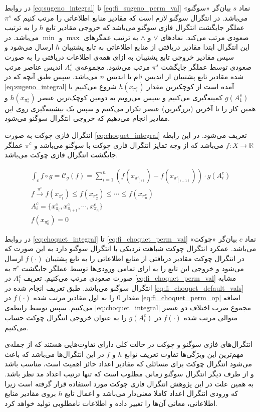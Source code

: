 در روابط
\ref{eq:sugeno_integral} تا \ref{eq:fi_sugeno_perm_val}
نماد $s$ بیان‌گر «سوگنو» می‌‌باشد. در انتگرال‌ سوگنو لازم است که مقادیر منابع اطلاعاتی را مرتب کنیم که $\pi^s$ عملگر جایگشت انتگرال فازی سوگنو می‌باشد که خروجی مقادیر تابع $h$ را به ترتیب صعودی مرتب می‌کند. نمادهای $\vee$ و $\wedge$ به ترتیب عمگرهای $\max$ و $\min$ می‌باشد. در این انتگرال ابتدا مقادیر دریافتی از منابع اطلاعاتی به تابع پشتیبان $h$ ارسال می‌شود و سپس مقادیر خروجی تابع پشتیبان به ازای همه‌ی اطلاعات دریافتی را به صورت صعودی توسط عملگر جایگشت $\pi^s$ مرتب می‌شود. مجموعه‌ی $A_i^s$ اندیس عناصر مرتب شده مقادیر تابع پشتیبان از اندیس $i$ام تا اندیس $n$ می‌باشد. سپس طبق آنچه که در \ref{eq:sugeno_integral} آمده است از کوچکترین مقدار $h(x_{\pi_1^s})$ شروع می‌کنیم با $g(A_1^s)$ کمینه‌گیری می‌کنیم و سپس می‌رویم به دومین کوچک‌ترین عنصر $h(x_{\pi_2^s})$ و همین کار را تا آخرین (بزرگترین) عنصر تکرار می‌کنیم و سپس یک بیشینه‌گیری روی این مقادیر انجام می‌دهیم که خروجی انتگرال سوگنو می‌شود.

انتگرال فازی چوکت به صورت \ref{eq:choquet_integral} تعریف می‌شود. در این رابطه
$f : X \rightarrow \mathbb{R}$
می‌باشد که از وجه تمایز انتگرال فازی چوکت با سوگنو می‌‌باشد و $\pi^c$ عملگر جایگشت انتگرال فازی چوکت می‌باشد.

\begin{eqnarray}
\int_{c} f \circ g = \mathcal{C}_g(f) = \sum_{i = 1}^{n} \left( f(x_{\pi_{(i)}^c}) - f(x_{\pi_{(i-1)}^c}) \right) \cdot g(A_i^c)\label{eq:choquet_integral}\\
f \xrightarrow{\pi^c} f(x_{\pi_1^c}) \leq f(x_{\pi_2^c}) \leq \cdots \leq f(x_{\pi_n^c})\label{eq:fi_choquet_perm_op}\\
A_i^c = \{x_{\pi_i}^c, x_{\pi_{i+1}}^c, \cdots, x_{\pi_n}^c\}\label{eq:fi_choquet_perm_val}\\
f(x_{\pi^c_0}) = 0\label{eq:fi_choquet_default_vals}
\end{eqnarray}

در روابط
\ref{eq:choquet_integral} تا \ref{eq:fi_choquet_perm_val}
نماد $c$ بیان‌گر «چوکت» می‌‌باشد. عمکرد انتگرال چوکت شباهت نزدیکی با انتگرال سوگنو دارد به این صورت که در انتگرال چوکت مقادیر دریافتی از منابع اطلاعاتی را به تابع پشتیبان $f(\cdot)$ ارسال می‌شود و خروجی این تابع را به ازای تمامی ورودی‌ها توسط عملگر جایگشت $\pi^c$ به صورت صعودی مرتب می‌کنیم. تعریف $A_i^c$ در \ref{eq:fi_choquet_perm_val} مشابه انتگرال سوگنو می‌باشد. طبق تعریف انجام شده در \ref{eq:fi_choquet_default_vals} مقدار 0 را به اول مقادیر مرتب شده $f(\cdot)$ در \ref{eq:fi_choquet_perm_op} اضافه می‌کنیم. سپس توسط رابطه‌ی \ref{eq:choquet_integral} مجموع ضرب اختلاف دو عنصر متوالی مرتب شده $f(\cdot)$ در $g(A_i^c)$ را به عنوان خروجی انتگرال چوکت حساب می‌کنیم.

انتگرال‌های فازی سوگنو و چوکت در حالت کلی دارای تفاوت‌هایی هستند که از جمله‌ی مهم‌ترین این ویژگی‌ها تفاوت تعریف توابع $h$ و $f$ در این انتگرال‌ها می‌باشد که باعث می‌شود انتگرال چوکت برای مسائلی که مقادیر اعداد حائز اهمیت است، مناسب باشد و از طرف دیگر انتگرال سوگنو زمانی مطلوب است که تنها ترتیب اعداد مد نظر باشد. به همین علت در این پژوهش انتگرال فازی چوکت مورد استفاده قرار گرفته است زیرا که ورودی انتگرال اعداد کاملا معنی‌دار می‌باشد و اعمال تابع $h$ بروی مقادیر منابع اطلاعاتی، معانی آن‌ها را تغییر داده و اطلاعات نامطلوبی تولید خواهد کرد.